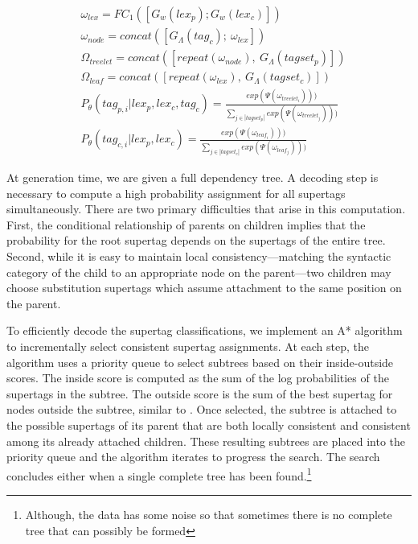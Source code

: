 \documentclass[11pt]{article}
\begin{document}
\begin{align}
&\omega_{lex} = FC_1([G_w(lex_p); G_w(lex_c)]) \label{eq:fergusn} \\
&\omega_{node}=concat([G_\Lambda(tag_c);~\omega_{lex}]) \nonumber \\
&\Omega_{treelet} = concat([repeat(\omega_{node}),~G_\Lambda(tagset_p)]) \nonumber \\
&\Omega_{leaf} = concat([repeat(\omega_{lex}),~G_\Lambda(tagset_c)]) \nonumber \\
&P_\theta(tag_{p,i} | lex_{p}, lex_{c}, tag_{c})=
\frac{exp(\Psi(\omega_{treelet_i})))}
{\sum_{j \in |tagset_p|} exp(\Psi(\omega_{treelet_j})))} \nonumber \\
&P_\theta(tag_{c,i} |lex_{p}, lex_{c}) = 
\frac{exp(\Psi(\omega_{leaf_i})))}
{\sum_{j \in |tagset_c|} exp(\Psi(\omega_{leaf_j})))} \nonumber 
\end{align}


At generation time, we are given a full dependency tree.  A decoding
step is necessary to compute a high probability
assignment for all supertags simultaneously.
%
There are two primary difficulties that arise in this computation.
%
First, the conditional relationship of parents on children implies that the probability for the root supertag depends on the supertags of the entire tree.
%
Second, while it is easy to maintain local consistency---matching the syntactic
category of the child to an appropriate node on the parent---two children may choose substitution supertags which assume attachment to the same position on the parent.

To efficiently decode the supertag classifications, we implement an A* algorithm to incrementally select consistent supertag assignments.
%
At each step, the algorithm uses a priority queue to select subtrees based on their inside-outside scores.
%
The inside score is computed as the sum of the log probabilities of the supertags in the subtree.
%
The outside score is the sum of the best supertag for nodes outside the subtree, similar to .
%
Once selected, the subtree is attached to the possible supertags of its parent that are both locally consistent and consistent among its already attached children.
%
These resulting subtrees are placed into the priority queue and the algorithm iterates to progress the search.
%
The search concludes either when a single complete tree has been found.\footnote{Although, the data has some noise so that sometimes there is no complete tree that can possibly be formed}
\end{document}
